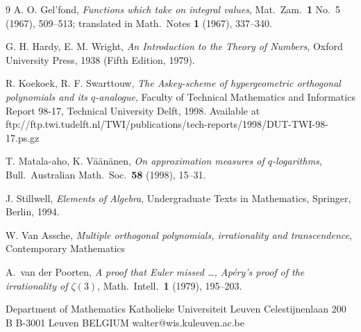 \documentclass[12pt]{article}
\begin{document}
\begin{thebibliography}{9}
 A. O. Gel'fond,
\textit{Functions which take on integral values},
Mat.\ Zam.\ \textbf{1} No.~5 (1967), 509--513;
translated in Math.\ Notes \textbf{1} (1967), 337--340.

 G. H. Hardy, E. M. Wright,
\textit{An Introduction to the Theory of Numbers},
Oxford University Press, 1938 (Fifth Edition, 1979).

 R. Koekoek, R. F. Swarttouw,
\textit{The Askey-scheme of hypergeometric orthogonal polynomials and
its $q$-analogue}, Faculty of Technical Mathematics and Informatics 
Report 98-17, Technical University Delft, 1998. 
Available at \\
\textsf{ftp://ftp.twi.tudelft.nl/TWI/publications/tech-reports/1998/DUT-TWI-98-17.ps.gz}

 T. Matala-aho, K. V\"a\"an\"anen,
\textit{On approximation measures of $q$-logarithms},
Bull.\ Australian Math.\ Soc.\ \textbf{58} (1998), 15--31.


 J. Stillwell,
\textit{Elements of Algebra},
Undergraduate Texts in Mathematics, Springer, Berlin, 1994.

 W. Van Assche,
\textit{Multiple orthogonal polynomials, irrationality and transcendence},
Contemporary Mathematics

 A.\ van der Poorten,
\textit{A proof that Euler missed \ldots, Ap\'ery's proof of the 
irrationality of $\zeta(3)$},
Math.\ Intell.\ \textbf{1} (1979), 195--203.

\end{thebibliography}


{\obeylines
Department of Mathematics
Katholieke Universiteit Leuven
Celestijnenlaan 200 B
B-3001 Leuven
BELGIUM
walter@wis.kuleuven.ac.be}
\end{document}
